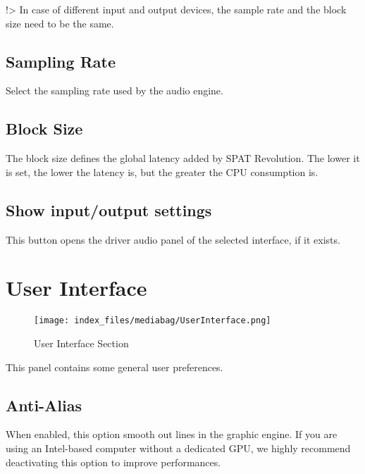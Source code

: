 \documentclass[
  letterpaper,
  DIV=11,
  numbers=noendperiod]{scrreport}
\begin{document}
!\textgreater{} In case of different input and output devices, the
sample rate and the block size need to be the same.

\hypertarget{sampling-rate}{%
\subsection{Sampling Rate}\label{sampling-rate}}

Select the sampling rate used by the audio engine.

\hypertarget{block-size}{%
\subsection{Block Size}\label{block-size}}

The block size defines the global latency added by SPAT Revolution. The
lower it is set, the lower the latency is, but the greater the CPU
consumption is.

\hypertarget{show-inputoutput-settings}{%
\subsection{Show input/output
settings}\label{show-inputoutput-settings}}

This button opens the driver audio panel of the selected interface, if
it exists.

\hypertarget{user-interface}{%
\section{User Interface}\label{user-interface}}

\begin{figure}

{\centering \texttt{[image: index\_files/mediabag/UserInterface.png]}

}

\caption{User Interface Section}

\end{figure}

This panel contains some general user preferences.

\hypertarget{anti-alias}{%
\subsection{Anti-Alias}\label{anti-alias}}

When enabled, this option smooth out lines in the graphic engine. If you
are using an Intel-based computer without a dedicated GPU, we highly
recommend deactivating this option to improve performances.
\end{document}
